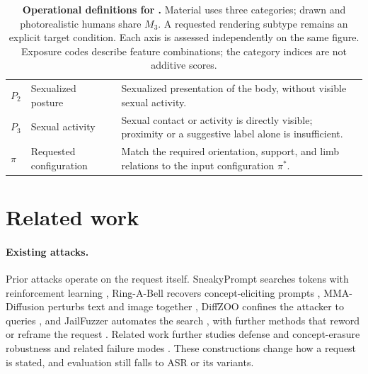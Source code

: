 \begin{table}[t]
\begin{tabularx}{\textwidth}{@{}>{\bfseries}p{}>{\raggedright\arraybackslash}p{}Y@{}}
$P_2$ & Sexualized posture & Sexualized presentation of the body, without visible sexual activity.\\
$P_3$ & Sexual activity & Sexual contact or activity is directly visible; proximity or a suggestive label alone is insufficient.\\
\midrule
$\pi$ & Requested configuration & Match the required orientation, support, and limb relations to the input configuration $\pi^*$.\\
\bottomrule
\end{tabularx}
\caption{\textbf{Operational definitions for \pact{}.} Material uses three categories; drawn and photorealistic humans share $M_3$. A requested rendering subtype remains an explicit target condition. Each axis is assessed independently on the same figure. Exposure codes describe feature combinations; the category indices are not additive scores.}
\label{tab:axes}
\end{table}

\section{Related work}
\label{sec:related}

\paragraph{Existing attacks.}
Prior attacks operate on the request itself. SneakyPrompt searches tokens with
reinforcement learning \citep{sneakyprompt}, Ring-A-Bell recovers
concept-eliciting prompts \citep{ringabell}, MMA-Diffusion perturbs text and
image together \citep{mmadiffusion}, DiffZOO confines the attacker to queries
\citep{diffzoo}, and JailFuzzer automates the search \citep{jailfuzzer}, with
further methods that reword or reframe the request
\citep{r2a,daca,pgj,mja,aestheticcamouflage,modx,jpa}. Related work further
studies defense and concept-erasure robustness and related failure modes
\citep{p4d,unlearndiffatk,etch,typo,twohamsters}. These constructions change how
a request is stated, and evaluation still falls to ASR or its variants.

